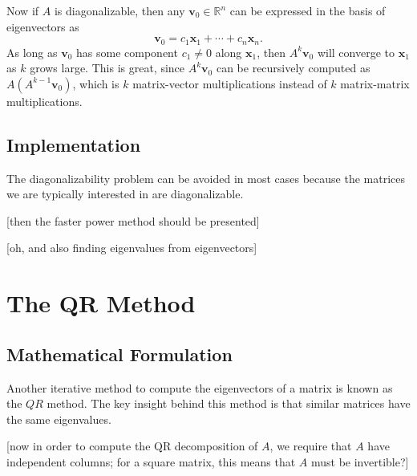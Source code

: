 \documentclass{article}
\let\vec\mathbf
\begin{document}
Now if $A$ is diagonalizable, then any $\vec{v}_0 \in \mathbb{R}^n$ can be expressed in the basis of eigenvectors as
\begin{equation*}
  \vec{v}_0 = c_1\vec{x}_1 + \cdots + c_n\vec{x}_n.
\end{equation*}
As long as $\vec{v}_0$ has some component $c_1 \neq 0$ along $\vec{x}_1$, then $A^k\vec{v}_0$ will converge to $\vec{x}_1$ as $k$ grows large. This is great, since $A^k\vec{v}_0$ can be recursively computed as $A(A^{k-1}\vec{v}_0)$, which is $k$ matrix-vector multiplications instead of $k$ matrix-matrix multiplications.

\subsection{Implementation}

The diagonalizability problem can be avoided in most cases because the matrices we are typically interested in are diagonalizable.

[then the faster power method should be presented]

[oh, and also finding eigenvalues from eigenvectors]

\section{The QR Method}
\subsection{Mathematical Formulation}
Another iterative method to compute the eigenvectors of a matrix is known as the $QR$ method. The key insight behind this method is that similar matrices have the same eigenvalues.

[now in order to compute the QR decomposition of $A$, we require that $A$ have independent columns; for a square matrix, this means that $A$ must be invertible?]
\end{document}
